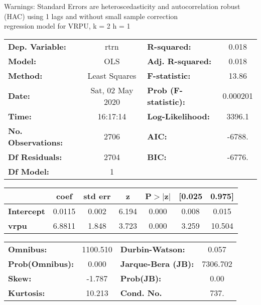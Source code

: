 Warnings: \newline
 [1] Standard Errors are heteroscedasticity and autocorrelation robust (HAC) using 1 lags and without small sample correction\\ 

regression model for VRPU, k = 2 h = 1\begin{center}
\begin{tabular}{lclc}
\toprule
\textbf{Dep. Variable:}    &       rtrn       & \textbf{  R-squared:         } &     0.018   \\
\textbf{Model:}            &       OLS        & \textbf{  Adj. R-squared:    } &     0.018   \\
\textbf{Method:}           &  Least Squares   & \textbf{  F-statistic:       } &     13.86   \\
\textbf{Date:}             & Sat, 02 May 2020 & \textbf{  Prob (F-statistic):} &  0.000201   \\
\textbf{Time:}             &     16:17:14     & \textbf{  Log-Likelihood:    } &    3396.1   \\
\textbf{No. Observations:} &        2706      & \textbf{  AIC:               } &    -6788.   \\
\textbf{Df Residuals:}     &        2704      & \textbf{  BIC:               } &    -6776.   \\
\textbf{Df Model:}         &           1      & \textbf{                     } &             \\
\bottomrule
\end{tabular}
\begin{tabular}{lcccccc}
                   & \textbf{coef} & \textbf{std err} & \textbf{z} & \textbf{P$> |$z$|$} & \textbf{[0.025} & \textbf{0.975]}  \\
\midrule
\textbf{Intercept} &       0.0115  &        0.002     &     6.194  &         0.000        &        0.008    &        0.015     \\
\textbf{vrpu}      &       6.8811  &        1.848     &     3.723  &         0.000        &        3.259    &       10.504     \\
\bottomrule
\end{tabular}
\begin{tabular}{lclc}
\textbf{Omnibus:}       & 1100.510 & \textbf{  Durbin-Watson:     } &    0.057  \\
\textbf{Prob(Omnibus):} &   0.000  & \textbf{  Jarque-Bera (JB):  } & 7306.702  \\
\textbf{Skew:}          &  -1.787  & \textbf{  Prob(JB):          } &     0.00  \\
\textbf{Kurtosis:}      &  10.213  & \textbf{  Cond. No.          } &     737.  \\
\bottomrule
\end{tabular}
\end{center}

